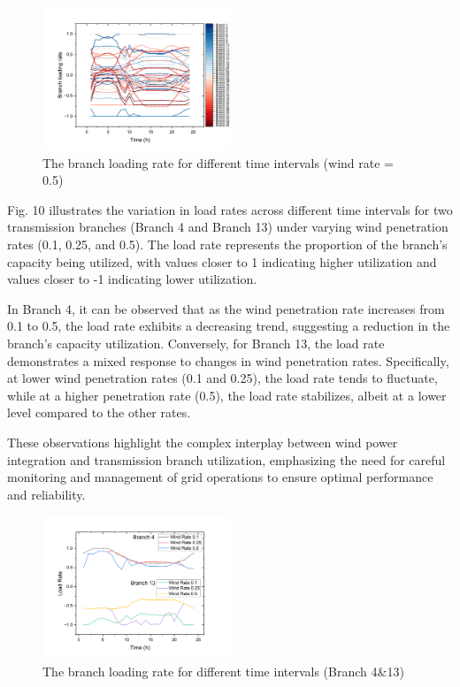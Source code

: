 \documentclass[lettersize,journal]{IEEEtran}
\begin{document}
\begin{figure}
	\centering
	\includegraphics[width=0.5\textwidth]{t2-br-wr0.5}
	\caption{The branch loading rate for different time intervals (wind rate = 0.5)}
	\label{fig_2}
\end{figure}

Fig. 10  illustrates the variation in load rates across different time intervals for two transmission branches (Branch 4 and Branch 13) under varying wind penetration rates (0.1, 0.25, and 0.5). The load rate represents the proportion of the branch's capacity being utilized, with values closer to 1 indicating higher utilization and values closer to -1 indicating lower utilization.

In Branch 4, it can be observed that as the wind penetration rate increases from 0.1 to 0.5, the load rate exhibits a decreasing trend, suggesting a reduction in the branch's capacity utilization. Conversely, for Branch 13, the load rate demonstrates a mixed response to changes in wind penetration rates. Specifically, at lower wind penetration rates (0.1 and 0.25), the load rate tends to fluctuate, while at a higher penetration rate (0.5), the load rate stabilizes, albeit at a lower level compared to the other rates.

These observations highlight the complex interplay between wind power integration and transmission branch utilization, emphasizing the need for careful monitoring and management of grid operations to ensure optimal performance and reliability.

\begin{figure}
	\centering
	\includegraphics[width=0.5\textwidth]{t2-difwr}
	\caption{The branch loading rate for different time intervals (Branch 4\&13)}
	\label{fig_2}
\end{figure}
\end{document}
